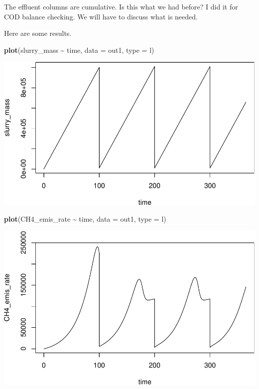 \documentclass[
]{article}
\newenvironment{Shaded}{\begin{snugshade}}{\end{snugshade}}
\newcommand{\AttributeTok}[1]{\textcolor[rgb]{0.13,0.29,0.53}{#1}}
\newcommand{\FunctionTok}[1]{\textcolor[rgb]{0.13,0.29,0.53}{\textbf{#1}}}
\newcommand{\NormalTok}[1]{#1}
\newcommand{\SpecialCharTok}[1]{\textcolor[rgb]{0.81,0.36,0.00}{\textbf{#1}}}
\newcommand{\StringTok}[1]{\textcolor[rgb]{0.31,0.60,0.02}{#1}}
\begin{document}
The effluent columns are cumulative. Is this what we had before? I did
it for COD balance checking. We will have to discuss what is needed.

Here are some results.

\begin{Shaded}
\begin{Highlighting}[]
\FunctionTok{plot}\NormalTok{(slurry\_mass }\SpecialCharTok{\textasciitilde{}}\NormalTok{ time, }\AttributeTok{data =}\NormalTok{ out1, }\AttributeTok{type =} \StringTok{\textquotesingle{}l\textquotesingle{}}\NormalTok{)}
\end{Highlighting}
\end{Shaded}

\includegraphics{simple_demo_files/figure-latex/unnamed-chunk-9-1.pdf}

\begin{Shaded}
\begin{Highlighting}[]
\FunctionTok{plot}\NormalTok{(CH4\_emis\_rate }\SpecialCharTok{\textasciitilde{}}\NormalTok{ time, }\AttributeTok{data =}\NormalTok{ out1, }\AttributeTok{type =} \StringTok{\textquotesingle{}l\textquotesingle{}}\NormalTok{)}
\end{Highlighting}
\end{Shaded}

\includegraphics{simple_demo_files/figure-latex/unnamed-chunk-9-2.pdf}
\end{document}
